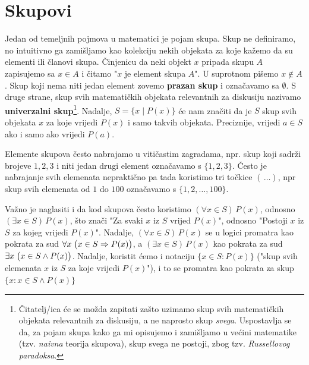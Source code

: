 \documentclass{book}
\let\originalleft\left
\let\originalright\right
\renewcommand{\left}{\mathopen{}\mathclose\bgroup\originalleft}
\renewcommand{\right}{\aftergroup\egroup\originalright}
\theoremstyle{definition}
\theoremstyle{definition}
\theoremstyle{remark}
\begin{document}
\section{Skupovi}
Jedan od temeljnih pojmova u matematici je pojam skupa. Skup ne
definiramo, no intuitivno ga zamišljamo kao kolekciju nekih objekata
za koje kažemo da su elementi ili članovi skupa.
Činjenicu da neki objekt $x$ pripada skupu $A$ zapisujemo sa $x\in A$
i čitamo "$x$ je element skupa $A$". U suprotnom pišemo $x\notin A$.
Skup koji nema niti jedan element zovemo \textbf{prazan skup} i označavamo sa $\emptyset$. S druge strane, skup svih matematičkih objekata relevantnih za diskusiju nazivamo \textbf{univerzalni skup}\footnote{Čitatelj/ica će se možda zapitati zašto uzimamo skup svih matematičkih objekata relevantnih za diskusiju, a ne naprosto skup \textit{svega}. Uspostavlja se da, za pojam skupa kako ga mi opisujemo i zamišljamo u većini matematike (tzv. \textit{naivna} teorija skupova), skup svega ne postoji, zbog tzv. \textit{Russellovog paradoksa}.}. Nadalje, $S=\{x\; |\; P(x)\}$ će nam značiti da je $S$ skup svih objekata $x$ za koje vrijedi $P(x)$ i samo takvih objekata. Preciznije, vrijedi $a\in S$ ako i samo ako vrijedi $P(a)$. 

Elemente skupova često nabrajamo u vitičastim zagradama, npr. skup koji sadrži brojeve $1, 2, 3$ i niti jedan drugi element označavamo s $\{1, 2, 3\}$. Često je nabrajanje svih elemenata nepraktično pa tada koristimo tri točkice $(\,\dots)$, npr skup svih elemenata od $1$ do $100$ označavamo s $\{1, 2,\dots, 100\}$.

Važno je naglasiti i da kod skupova često koristimo $(\forall x\in S)\, P(x)$, odnosno $(\exists x\in S)\, P(x)$, što znači "Za svaki $x$ iz $S$ vrijed $P(x)$", odnosno "Postoji $x$ iz $S$ za kojeg vrijedi $P(x)$". Nadalje, $(\forall x\in S)\, P(x)$ se u logici promatra kao pokrata za sud $\forall x\; \left(x\in S\Rightarrow P(x)\right)$, a $(\exists x\in S)\, P(x)$ kao pokrata za sud $\exists x\; \left(x\in S\wedge P(x)\right)$. Nadalje, koristit ćemo i notaciju $\{x\in S : P(x)\}$ ("skup svih elemenata $x$ iz $S$ za koje vrijedi $P(x)$"), i to se promatra kao pokrata za skup $\{x : x\in S\wedge P(x)\}$
\end{document}
